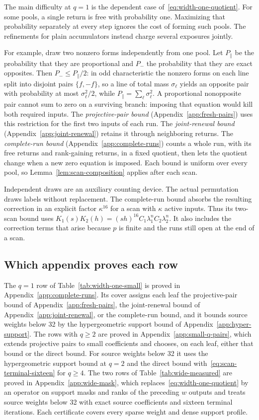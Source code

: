 The main difficulty at $q=1$ is the dependent case of~\eqref{eq:width-one-quotient}.
For some pools, a single return is free with probability one.
Maximizing that probability separately at every step ignores the cost
of forming such pools. The refinements for plain accumulators instead
charge several exposures jointly.

For example, draw two nonzero forms independently from one pool.
Let $P_\parallel$ be the probability that they are proportional and
$P_-$ the probability that they are exact opposites. Then
$P_-\le P_\parallel/2$: in odd characteristic the nonzero forms on each
line split into disjoint pairs $\{f,-f\}$, so a line of total mass
$\sigma_\ell$ yields an opposite pair with probability at most
$\sigma_\ell^2/2$, while $P_\parallel=\sum_\ell\sigma_\ell^2$.
A proportional nonopposite pair cannot sum to zero on a surviving
branch: imposing that equation would kill both required inputs.
The \emph{projective-pair bound} (Appendix~\ref{app:fresh-pairs}) uses
this restriction for the first two inputs of each run. The
\emph{joint-renewal bound} (Appendix~\ref{app:joint-renewal}) retains it
through neighboring returns. The \emph{complete-run bound}
(Appendix~\ref{app:complete-runs}) counts a whole run, with its free
returns and rank-gaining returns, in a fixed quotient, then lets the
quotient change when a new zero equation is imposed. Each bound is
uniform over every pool, so Lemma~\ref{lem:scan-composition} applies
after each scan.

Independent draws are an auxiliary counting device. The actual
permutation draws labels without replacement. The complete-run bound
absorbs the resulting correction in an explicit factor $\kappa^{16}$
for a scan with $\kappa$ active inputs. Thus its two-scan bound uses
$K_1(s)K_2(h)=(sh)^{16}C_1\lambda_1^nC_2\lambda_2^n$. It also includes
the correction terms that arise because $p$ is finite and the runs still
open at the end of a scan.

\subsection{Which appendix proves each row}

The $q=1$ row of Table~\ref{tab:width-one-small} is proved in
Appendix~\ref{app:complete-runs}. Its cover assigns each leaf the
projective-pair bound of Appendix~\ref{app:fresh-pairs}, the
joint-renewal bound of Appendix~\ref{app:joint-renewal}, or the
complete-run bound, and it bounds source weights below 32 by the
hypergeometric support bound of Appendix~\ref{app:hyper-support}.
The rows with $q\ge2$ are proved in Appendix~\ref{app:small-q-pairs},
which extends projective pairs to small coefficients and chooses, on
each leaf, either that bound or the direct bound. For source weights
below 32 it uses the hypergeometric support bound at $q=2$ and the
direct bound with~\eqref{eq:scan-terminal-sixteen} for $q\ge4$.
The two rows of Table~\ref{tab:wide-measured} are proved in
Appendix~\ref{app:wide-mask}, which replaces~\eqref{eq:width-one-quotient}
by an operator on support masks and ranks of the preceding $w$ outputs
and treats source weights below 32 with exact source coefficients and
sixteen terminal iterations. Each certificate covers every sparse weight
and dense support profile.
